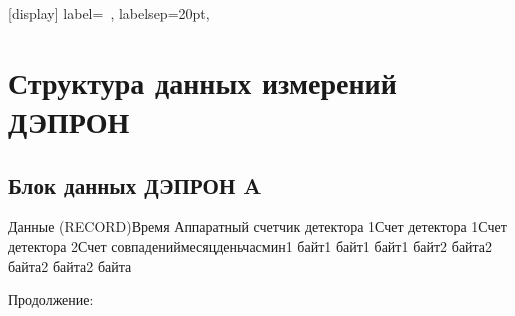 \appendix
\sectionformat{\chapter}[display]{%
    label=\chaptertitlename\ \thechapter,%
    labelsep=20pt,
}
\renewcommand\thechapter{\Asbuk{chapter}} %



\chapter{Структура данных измерений ДЭПРОН} \label{AppendixA}

\section{Блок данных ДЭПРОН A}




{\small Данные (RECORD)Время Аппаратный счетчик детектора }{\small 1}{\small Счет детектора }{\small 1}{\small Счет детектора 2Счет совпадениймесяцденьчасмин1 байт1 байт1 байт1 байт2 байта2 байта2 байта2 байта}


Продолжение:


\small 
	
